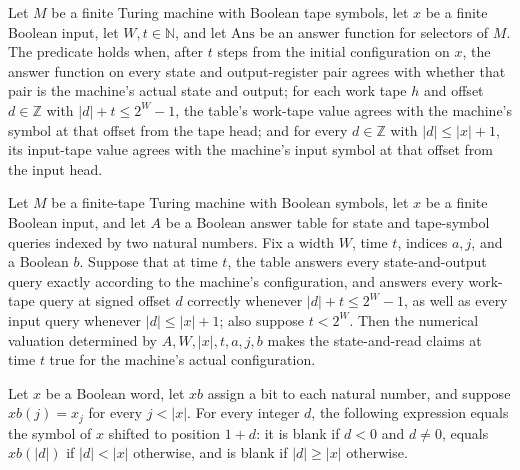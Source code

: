 \begin{definition}
\label{Complexity.Meyer.Correct}
\leanok
{}
Let $M$ be a finite Turing machine with Boolean tape symbols, let $x$ be a finite
Boolean input, let $W,t\in\mathbb{N}$, and let $\mathrm{Ans}$ be an answer function for
selectors of $M$. The predicate holds when, after $t$ steps from the initial
configuration on $x$, the answer function on every state and output-register pair agrees
with whether that pair is the machine’s actual state and output; for each work tape $h$
and offset $d\in\mathbb{Z}$ with $|d|+t\le 2^W-1$, the table’s work-tape value agrees
with the machine’s symbol at that offset from the tape head; and for every
$d\in\mathbb{Z}$ with $|d|\le |x|+1$, its input-tape value agrees with the machine’s
input symbol at that offset from the input head.
\end{definition}

\begin{theorem}
\label{Complexity.Meyer.claims_of_correct}
\leanok
{}
Let $M$ be a finite-tape Turing machine with Boolean symbols, let $x$ be a finite
Boolean input, and let $A$ be a Boolean answer table for state and tape-symbol queries
indexed by two natural numbers. Fix a width $W$, time $t$, indices $a,j$, and a Boolean
$b$. Suppose that at time $t$, the table answers every state-and-output query exactly
according to the machine's configuration, and answers every work-tape query at signed
offset $d$ correctly whenever $|d|+t\le 2^W-1$, as well as every input query whenever
$|d|\le |x|+1$; also suppose $t<2^W$. Then the numerical valuation determined by
$A,W,|x|,t,a,j,b$ makes the state-and-read claims at time $t$ true for the machine's
actual configuration.
\end{theorem}

\begin{theorem}
\label{Complexity.Meyer.xin_eq}
\leanok
{}
Let $x$ be a Boolean word, let $xb$ assign a bit to each natural number, and suppose
$xb(j)=x_j$ for every $j<|x|$. For every integer $d$, the following expression equals
the symbol of $x$ shifted to position $1+d$: it is blank if $d<0$ and $d\ne0$, equals
$xb(|d|)$ if $|d|<|x|$ otherwise, and is blank if $|d|\ge |x|$ otherwise.
\end{theorem}

